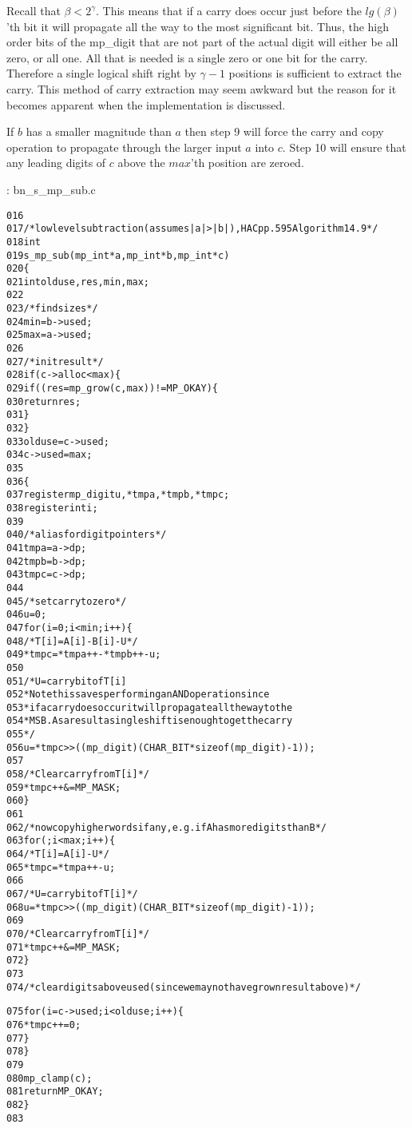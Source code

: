 \documentclass[b5paper]{book}
\begin{document}
Recall that $\beta < 2^{\gamma}$.  This means that if a carry does occur just before the $lg(\beta)$'th bit it will propagate all the way to the most 
significant bit.  Thus, the high order bits of the mp\_digit that are not part of the actual digit will either be all zero, or all one. All that
is needed is a single zero or one bit for the carry.  Therefore a single logical shift right by $\gamma - 1$ positions is sufficient to extract the 
carry.  This method of carry extraction may seem awkward but the reason for it becomes apparent when the implementation is discussed.  

If $b$ has a smaller magnitude than $a$ then step 9 will force the carry and copy operation to propagate through the larger input $a$ into $c$.  Step
10 will ensure that any leading digits of $c$ above the $max$'th position are zeroed.

\vspace{+3mm}\begin{small}
\hspace{-5.1mm}{\bf File}: bn\_s\_mp\_sub.c
\vspace{-3mm}
\begin{alltt}
016   
017   /* low level subtraction (assumes |a| > |b|), HAC pp.595 Algorithm 14.9 */
018   int
019   s_mp_sub (mp_int * a, mp_int * b, mp_int * c)
020   \{
021     int     olduse, res, min, max;
022   
023     /* find sizes */
024     min = b->used;
025     max = a->used;
026   
027     /* init result */
028     if (c->alloc < max) \{
029       if ((res = mp_grow (c, max)) != MP_OKAY) \{
030         return res;
031       \}
032     \}
033     olduse = c->used;
034     c->used = max;
035   
036     \{
037       register mp_digit u, *tmpa, *tmpb, *tmpc;
038       register int i;
039   
040       /* alias for digit pointers */
041       tmpa = a->dp;
042       tmpb = b->dp;
043       tmpc = c->dp;
044   
045       /* set carry to zero */
046       u = 0;
047       for (i = 0; i < min; i++) \{
048         /* T[i] = A[i] - B[i] - U */
049         *tmpc = *tmpa++ - *tmpb++ - u;
050   
051         /* U = carry bit of T[i]
052          * Note this saves performing an AND operation since
053          * if a carry does occur it will propagate all the way to the
054          * MSB.  As a result a single shift is enough to get the carry
055          */
056         u = *tmpc >> ((mp_digit)(CHAR_BIT * sizeof (mp_digit) - 1));
057   
058         /* Clear carry from T[i] */
059         *tmpc++ &= MP_MASK;
060       \}
061   
062       /* now copy higher words if any, e.g. if A has more digits than B  */
063       for (; i < max; i++) \{
064         /* T[i] = A[i] - U */
065         *tmpc = *tmpa++ - u;
066   
067         /* U = carry bit of T[i] */
068         u = *tmpc >> ((mp_digit)(CHAR_BIT * sizeof (mp_digit) - 1));
069   
070         /* Clear carry from T[i] */
071         *tmpc++ &= MP_MASK;
072       \}
073   
074       /* clear digits above used (since we may not have grown result above) */
      
075       for (i = c->used; i < olduse; i++) \{
076         *tmpc++ = 0;
077       \}
078     \}
079   
080     mp_clamp (c);
081     return MP_OKAY;
082   \}
083   
\end{alltt}
\end{small}
\end{document}
